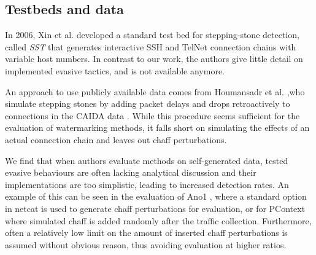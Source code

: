 \documentclass[runningheads,11pt]{llncs}\usepackage[]{graphicx}\usepackage[]{color}
\begin{document}
\subsection{Testbeds and data}

In 2006, Xin et al. \cite{xin2006testbed} developed a standard test bed for stepping-stone detection, called \textit{SST} that generates interactive SSH and TelNet connection chains with variable host numbers.%
In contrast to our work, the authors give little detail on implemented evasive tactics, and is not available anymore.

An approach to use publicly available data comes from Houmansadr et al. \cite{nasr2018deepcorr},who simulate stepping stones by adding packet delays and drops retroactively to connections in the CAIDA data \cite{CAIDA2018}.
While this procedure seems sufficient for the evaluation of watermarking methods, it falls short on simulating the effects of an actual connection chain and leaves out chaff perturbations. 

We find that when authors evaluate methods on self-generated data, tested evasive behaviours are often lacking analytical discussion and their implementations are too simplistic, leading to increased detection rates. An example of this can be seen in the evaluation of Ano1 \cite{di2011detecting}, where a standard option in netcat is used to generate chaff perturbations for evaluation, or for PContext \cite{yang2015rtt} where simulated chaff is added randomly after the traffic collection.%
Furthermore, often a relatively low limit on the amount of inserted chaff perturbations is assumed without obvious reason, thus avoiding evaluation at higher ratios. %
\end{document}
